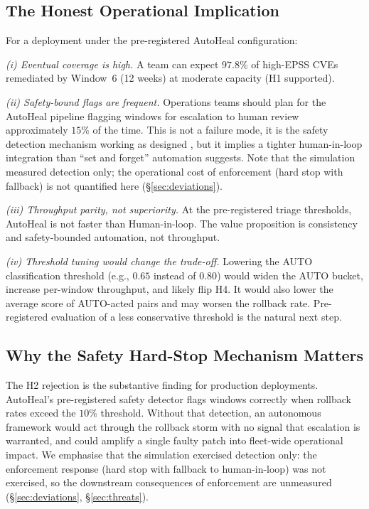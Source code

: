\subsection{The Honest Operational Implication}

For a deployment under the pre-registered AutoHeal configuration:

\textit{(i) Eventual coverage is high.} A team can expect $97.8\%$
of high-EPSS CVEs remediated by Window~6 (12 weeks) at moderate
capacity (H1 supported).

\textit{(ii) Safety-bound flags are frequent.} Operations teams
should plan for the AutoHeal pipeline flagging windows for
escalation to
human review approximately $15\%$ of the time. This is not a
failure mode, it is the safety detection mechanism working as
designed
, but it implies a tighter human-in-loop integration than
``set and forget'' automation suggests. Note that the simulation
measured detection only; the operational cost of enforcement
(hard stop with fallback) is not quantified here
(\S\ref{sec:deviations}).

\textit{(iii) Throughput parity, not superiority.} At the
pre-registered triage thresholds, AutoHeal is not faster than
Human-in-loop. The value proposition is consistency and
safety-bounded automation, not throughput.

\textit{(iv) Threshold tuning would change the trade-off.}
Lowering the AUTO classification threshold (e.g., $0.65$ instead
of $0.80$) would widen the AUTO bucket, increase per-window
throughput, and likely flip H4. It would also lower the
average score of AUTO-acted pairs and may worsen the rollback
rate. Pre-registered evaluation of a less conservative
threshold is the natural next step.

\subsection{Why the Safety Hard-Stop Mechanism Matters}

The H2 rejection is the substantive finding for production
deployments. AutoHeal's pre-registered safety detector flags
windows correctly when rollback rates exceed the $10\%$ threshold.
Without
that detection, an autonomous framework would act through the
rollback storm with no signal that escalation is warranted, and
could amplify a single faulty patch into fleet-wide
operational impact. We emphasise that the simulation exercised
detection only: the enforcement response (hard stop with fallback
to human-in-loop) was not exercised, so the downstream
consequences of enforcement are unmeasured
(\S\ref{sec:deviations}, \S\ref{sec:threats}).


